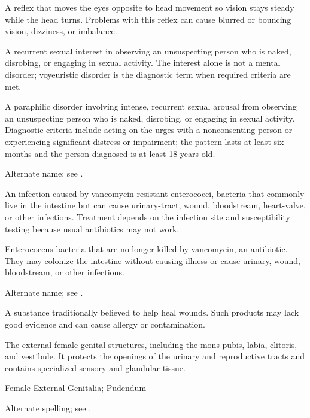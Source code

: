 A reflex that moves the eyes opposite to head movement so vision stays steady while the head turns. Problems with this reflex can cause blurred or bouncing vision, dizziness, or imbalance.

 A recurrent sexual interest in observing an unsuspecting person who is naked, disrobing, or engaging in sexual activity. The interest alone is not a mental disorder; voyeuristic disorder is the diagnostic term when required criteria are met.

 A paraphilic disorder involving intense, recurrent sexual arousal from observing an unsuspecting person who is naked, disrobing, or engaging in sexual activity. Diagnostic criteria include acting on the urges with a nonconsenting person or experiencing significant distress or impairment; the pattern lasts at least six months and the person diagnosed is at least 18 years old.

 Alternate name; see .

 An infection caused by vancomycin-resistant enterococci, bacteria that commonly live in the intestine but can cause urinary-tract, wound, bloodstream, heart-valve, or other infections. Treatment depends on the infection site and susceptibility testing because usual antibiotics may not work.

 Enterococcus bacteria that are no longer killed by vancomycin, an antibiotic. They may colonize the intestine without causing illness or cause urinary, wound, bloodstream, or other infections.

 Alternate name; see .

 A substance traditionally believed to help heal wounds. Such products may lack good evidence and can cause allergy or contamination.

 The external female genital structures, including the mons pubis, labia, clitoris, and vestibule. It protects the openings of the urinary and reproductive tracts and contains specialized sensory and glandular tissue.

\synonyms
Female External Genitalia; Pudendum

 Alternate spelling; see .

